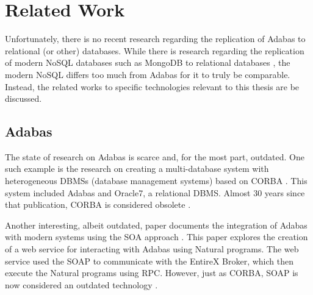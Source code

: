 \chapter{Related Work}
\label{ch03:litreview}
Unfortunately, there is no recent research regarding the replication of Adabas to relational (or other) databases. While there is research regarding the replication of modern NoSQL databases such as MongoDB to relational databases \cite{aftabnosqletltordbms}, the modern NoSQL differs too much from Adabas for it to truly be comparable. Instead, the related works to specific technologies relevant to this thesis are be discussed.

\section{Adabas}
\label{ch03:litreview:adabas}
The state of research on Adabas is scarce and, for the most part, outdated. One such example is the research on creating a multi-database system with heterogeneous DBMSs (database management systems) based on \ac{CORBA} \cite{ozhan1996making}. This system included Adabas and Oracle7, a relational DBMS. Almost 30 years since that publication, \ac{CORBA} is considered obsolete \cite{fallofcorba}.

Another interesting, albeit outdated, paper documents the integration of Adabas with modern systems using the \ac{SOA} approach \cite{koschelmainframemodernization}. This paper explores the creation of a web service for interacting with Adabas using Natural programs. The web service used the \ac{SOAP} to communicate with the EntireX Broker, which then execute the Natural programs using \ac{RPC}. However, just as \ac{CORBA}, \ac{SOAP} is now considered an outdated technology \cite{soapoutdated}.

